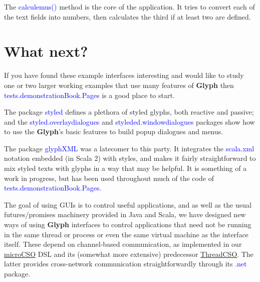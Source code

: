 \documentclass[12pt,a4paper]{article}
\def\Glyph{\textbf{Glyph}\xspace}
\def\Scala#1{\textcolor{blue}{\textsf{#1}}}
\def\S#1{\section{#1}}
\begin{document}
The \Scala{calculemus()} method is the core of the application.
It tries to convert each of the text
fields into numbers, then calculates the
third if at least two are defined.



\S{What next?}
If you have found these example interfaces interesting and would like to
study one or two larger working examples that use many features
of \Glyph then \Scala{tests.demonstrationBook.Pages} is a
good place to start. 

The package \Scala{styled} defines a plethora of styled glyphs,
both reactive and passive; and the \Scala{styled.overlaydialogues}
and \Scala{styleded.windowdialogues} packages show how to use the
\Glyph's basic features to build popup dialogues and menus.

The package \Scala{glyphXML} was a latecomer to this party. It
integrates the \Scala{scala.xml}  notation embedded (in Scala 2)
with styles, and makes it fairly straightforward to mix styled
texts with glyphs in a way that may be helpful. It is
something of a work in progress, but has been used throughout much
of the code of \Scala{tests.demonstrationBook.Pages}.

The goal of using  GUIs is to control useful applications,
and as well as the usual futures/promises machinery provided
in Java and Scala, we have designed new ways of using \Glyph interfaces to
control applications that need not be running in the same thread or process
or even the same virtual machine as the interface itself. These depend
on channel-based communication, as implemented in our
\href{https://github.com/sufrin/microCSO}{microCSO}
DSL and its (somewhat more extensive) predecessor
\href{https://github.com/sufrin/ThreadCSO}{ThreadCSO}. The latter
provides cross-network communication straightforwardly through its
\Scala{.net} package.
\end{document}
